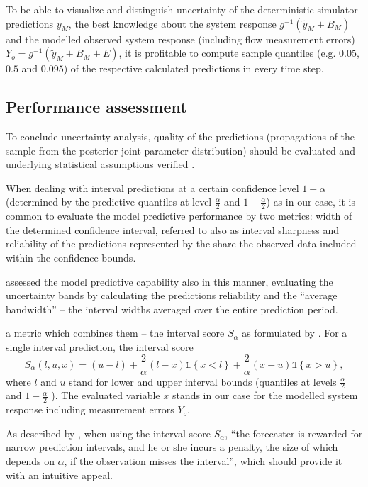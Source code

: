 \documentclass{ctuthesis}\usepackage[]{graphicx}\usepackage[]{color}
\begin{document}
To be able to visualize and distinguish uncertainty of the deterministic simulator predictions $y_M$, the best knowledge about the system response $g^{-1}(\tilde{y}_M+ B_M)$ and the modelled observed system response (including flow measurement errors) $Y_o= g^{-1}(\tilde{y}_M+ B_M + E)$, it is profitable to compute sample quantiles (e.g. $0.05$, $0.5$ and $0.095$) of the respective calculated predictions in every time step.



\subsection{Performance assessment}
To conclude uncertainty analysis, quality of the predictions (propagations of the sample from the posterior joint parameter distribution) should be evaluated and underlying statistical assumptions verified \citep{giudice2013improving}. 

When dealing with interval predictions at a certain confidence level $1-\alpha$ (determined by the predictive quantiles at level $ \frac{\alpha}{2} $ and $ 1-\frac{\alpha}{2} $) as in our case, it is common to evaluate the model predictive performance by two metrics: width of the determined confidence interval, referred to also as interval sharpness \mbox{\citep[e.g.][]{breinholt2012formal}} and reliability of the predictions represented by the share the observed data included within the confidence bounds.

\cite{giudice2013improving} assessed the model predictive capability also in this manner, evaluating the uncertainty bands  by calculating the predictions reliability and the \enquote{average bandwidth} --  the interval widths averaged over the entire prediction period.

 a metric which combines them -- the interval score $S_\alpha$ as formulated by \cite{gneiting2007strictly}. For a single interval prediction, the interval score 
\begin{equation}
S_\alpha(l,u,x) =  ( u - l ) + \frac{2}{\alpha} (l - x)  \mathds{1} \left\{x < l \right\} + \frac{2}{\alpha} (x - u)  \mathds{1} \left\{x > u \right\} ,
\end{equation}
where $l$ and $u$ stand for lower and upper interval bounds (quantiles at levels $ \frac{\alpha}{2} $ and $ 1-\frac{\alpha}{2} $ ). The evaluated variable $x$ stands in our case for the modelled system response including measurement errors $Y_o$. 

As described by \cite{gneiting2007strictly}, when using the interval score $S_\alpha$, \enquote{the forecaster is rewarded for narrow prediction intervals, and he or she incurs a penalty, the size of which depends on $\alpha$, if the observation misses the interval}, which should provide it with an intuitive appeal.
\end{document}
